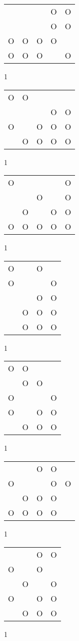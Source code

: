\begin{tabular}{|m{0.2cm}m{0.2cm}m{0.2cm}m{0.2cm}m{0.2cm}|}\hline
 & & &O&O\\
 & & &O&O\\
O&O&O&O& \\
O&O&O& &O\\
\hline\end{tabular}1
\begin{tabular}{|m{0.2cm}m{0.2cm}m{0.2cm}m{0.2cm}m{0.2cm}|}\hline
O&O& & & \\
 & & &O&O\\
O& &O&O&O\\
 &O&O&O&O\\
\hline\end{tabular}1
\begin{tabular}{|m{0.2cm}m{0.2cm}m{0.2cm}m{0.2cm}m{0.2cm}|}\hline
O& & & &O\\
 & &O& &O\\
 &O& &O&O\\
O&O&O&O&O\\
\hline\end{tabular}1
\begin{tabular}{|m{0.2cm}m{0.2cm}m{0.2cm}m{0.2cm}|}\hline
O& &O& \\
O& & &O\\
 & &O&O\\
 &O&O&O\\
 &O&O&O\\
\hline\end{tabular}1
\begin{tabular}{|m{0.2cm}m{0.2cm}m{0.2cm}m{0.2cm}|}\hline
O&O& & \\
 &O&O& \\
O& & &O\\
O& &O&O\\
 &O&O&O\\
\hline\end{tabular}1
\begin{tabular}{|m{0.2cm}m{0.2cm}m{0.2cm}m{0.2cm}m{0.2cm}|}\hline
 & &O&O& \\
O& & &O&O\\
 &O&O&O& \\
O&O&O&O& \\
\hline\end{tabular}1
\begin{tabular}{|m{0.2cm}m{0.2cm}m{0.2cm}m{0.2cm}|}\hline
 & &O&O\\
O& &O& \\
 &O& &O\\
O& &O&O\\
 &O&O&O\\
\hline\end{tabular}1
